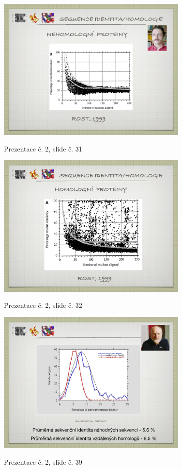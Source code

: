 \documentclass[DIV=8]{scrreprt}
\begin{document}
\begin{figure}
    \caption{Prezentace č. 2, slide č. 31}
    \includegraphics[width=0.85\textwidth]{slides-2/slide-31.jpg}
    \centering
    \label{slides-2-slide-31}
\end{figure}
\begin{figure}
    \caption{Prezentace č. 2, slide č. 32}
    \includegraphics[width=0.85\textwidth]{slides-2/slide-32.jpg}
    \centering
    \label{slides-2-slide-32}
\end{figure}
\begin{figure}
    \caption{Prezentace č. 2, slide č. 39}
    \includegraphics[width=0.85\textwidth]{slides-2/slide-39.jpg}
    \centering
    \label{slides-2-slide-39}
\end{figure}
\end{document}

